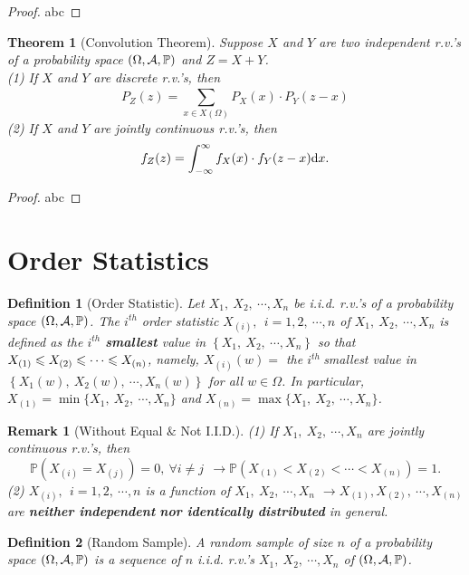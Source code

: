 \documentclass[openany,12pt]{book}
\newtheorem{theorem}{Theorem}[chapter]
\newtheorem{remark}{Remark}[chapter]
\newtheorem{definition}{Definition}[chapter]
\begin{document}
\begin{proof}
  abc
\end{proof}

\begin{theorem}[Convolution Theorem]
Suppose $X$ and $Y$ are two independent r.v.'s of a probability space $(\Omega,\mathcal{A},\mathbb{P})$ and $Z = X + Y$.\\
(1) If $X$ and $Y$ are discrete r.v.'s, then
\[P_{Z}(z) = \sum_{x \in X(\Omega)}^{}{P_{X}(x) \cdot}P_{Y}(z-x)\]
(2) If $X$ and $Y$ are jointly continuous r.v.'s, then
\[f_{Z}(z) = \int_{- \infty}^{\infty}{f_{X}(x) \cdot f_{Y}(z-x)\mathrm{d} x}.\]
\end{theorem}

\begin{proof}
  abc
\end{proof}

\section{Order Statistics}

\begin{definition}[Order Statistic]
Let $X_{1},\ X_{2},\ \cdots,X_{n}$ be i.i.d. r.v.'s of a probability space $(\Omega,\mathcal{A},\mathbb{P})$. The $i^{th}$ order statistic $X_{(i)},\ \ i = 1,2,\ \cdots,n$
of $X_{1},\ X_{2},\ \cdots,X_{n}$ is defined as the $i^{th}$
\textbf{smallest} value in $\left\{ X_{1},\ X_{2},\ \cdots,X_{n} \right\}$ so that
$X_{(1)} \leqslant X_{(2)} \leqslant \cdots\leqslant X_{(n)}$, namely, $X_{\left( i \right)}(w) =$ the $i^{th}\ $smallest value in $\left\{ X_{1}(w),\ X_{2}(w),\ \cdots,X_{n}(w) \right\}$ for all $w \in \Omega$. In particular,
$X_{(1)} = \min\{ X_{1},\ X_{2},\ \cdots,X_{n}\}$ and $X_{(n)} = \max\{ X_{1},\ X_{2},\ \cdots,X_{n}\}$.
\end{definition}

\begin{remark}[Without Equal $\&$ Not I.I.D.]
(1) If $X_{1},\ X_{2},\ \cdots,X_{n}$ are jointly continuous r.v.'s, then
\[\mathbb{P}\left( X_{\left( i \right)} = X_{\left( j \right)} \right) = 0,\ \forall i \neq j\ \  \to \mathbb{P}\left( X_{\left( 1 \right)} < X_{\left( 2 \right)} < \cdots< X_{\left( n \right)} \right) = 1.\]
(2) $X_{(i)},\ \ i = 1,2,\ \cdots,n$ is a function of $X_{1},\ X_{2},\ \cdots,X_{n}$ $\to X_{(1)},X_{(2)},\ \cdots,X_{(n)}$ are \textbf{neither independent} \textbf{nor identically distributed} in general.
\end{remark}

\begin{definition}[Random Sample]
A random sample of size $n$ of a probability space $(\Omega,\mathcal{A},\mathbb{P})$ is a sequence of $n$ i.i.d. r.v.'s $X_1,\ X_2,\ \cdots,X_n$ of $(\Omega,\mathcal{A},\mathbb{P})$.
\end{definition}
\end{document}
